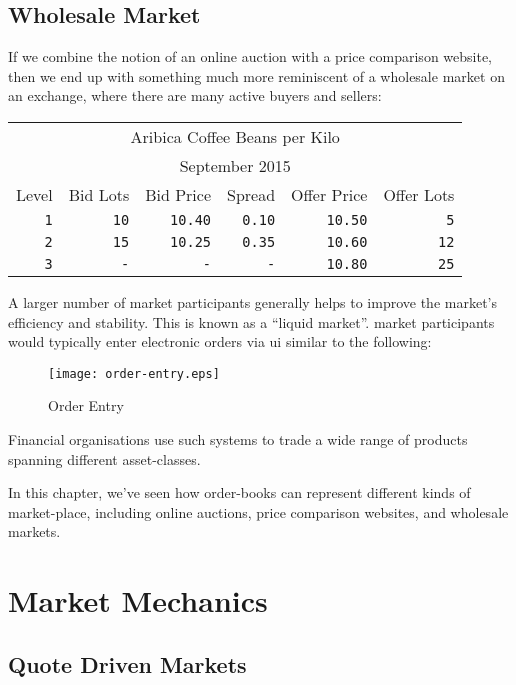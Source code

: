 \documentclass[12pt,a4paper,notitlepage,bibliography=totoc]{scrreprt}
\begin{document}
\section{Wholesale Market}

If we combine the notion of an online \gls{auction} with a price comparison website, then we end up
with something much more reminiscent of a wholesale \gls{market} on an \gls{exchange}, where there
are many active buyers and sellers:

\vspace{5mm}
\begin{tabular}{r|rrrrr}
\multicolumn{6}{c}{Aribica Coffee Beans per Kilo}\\
\multicolumn{6}{c}{September 2015}\\
Level&Bid Lots&Bid Price&Spread&Offer Price&Offer Lots\\
\hline
\texttt{1}&\texttt{10}&\texttt{10.40}&\texttt{0.10}&\texttt{10.50}&\texttt{5}\\
\texttt{2}&\texttt{15}&\texttt{10.25}&\texttt{0.35}&\texttt{10.60}&\texttt{12}\\
\texttt{3}&\texttt{-}&\texttt{-}&\texttt{-}&\texttt{10.80}&\texttt{25}\\
\end{tabular}
\vspace{5mm}

A larger number of \gls{market} participants generally helps to improve the \gls{market}'s
efficiency and stability. This is known as a ``\gls{liquid market}''. \Gls{market} participants
would typically enter electronic \glspl{order} via \gls{ui} similar to the following:

\begin{figure}[H]
\centering
\texttt{[image: order-entry.eps]}
\caption{Order Entry}
\end{figure}

Financial organisations use such systems to trade a wide range of products spanning different
\gls{asset}-classes.

In this chapter, we've seen how \glspl{order-book} can represent different kinds of
\gls{market-place}, including online \glspl{auction}, price comparison websites, and wholesale
\glspl{market}.

\chapter{Market Mechanics}

\section{Quote Driven Markets}
\end{document}
